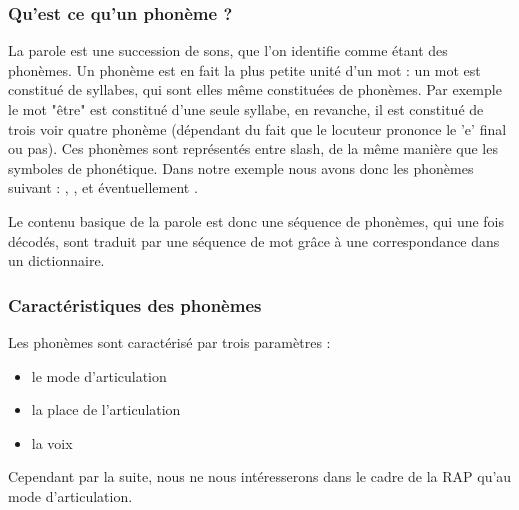 	\subsubsection{Qu'est ce qu'un phonème ?}
	La parole est une succession de sons, que l'on identifie comme étant des phonèmes. Un phonème est en fait la plus petite unité d'un mot : un mot est constitué de syllabes, qui sont elles même constituées de phonèmes. Par exemple le mot "être" est constitué d'une seule syllabe, en revanche, il est constitué de trois voir quatre phonème (dépendant du fait que le locuteur prononce le 'e' final ou pas). Ces phonèmes sont représentés entre slash, de la même manière que les symboles de phonétique. Dans notre exemple nous avons donc les phonèmes suivant : , ,  et éventuellement  .
	
	Le contenu basique de la parole est donc une séquence de phonèmes, qui une fois décodés, sont traduit par une séquence de mot grâce à une correspondance dans un dictionnaire.
	\subsubsection{Caractéristiques des phonèmes}
	Les phonèmes sont caractérisé par trois paramètres :
	\begin{itemize}
		\item{le mode d'articulation}
		\item{la place de l'articulation}
		\item{la voix}
	\end{itemize}
	Cependant par la suite, nous ne nous intéresserons dans le cadre de la RAP qu'au mode d'articulation.
	
